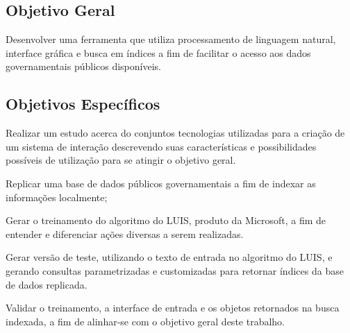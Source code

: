 \subsection{Objetivo Geral}
Desenvolver uma ferramenta que utiliza processamento de linguagem natural, interface gráfica e busca em índices a fim de facilitar o acesso aos dados governamentais públicos disponíveis.

\subsection{Objetivos Específicos}
Realizar um estudo acerca do conjuntos tecnologias utilizadas para a criação de um sistema de interação descrevendo suas características e possibilidades possíveis de utilização para se atingir o objetivo geral.

Replicar uma base de dados públicos governamentais a fim de indexar as informações localmente;

Gerar o treinamento do algoritmo do LUIS, produto da Microsoft, a fim de entender e diferenciar ações diversas a serem realizadas.

Gerar versão de teste, utilizando o texto de entrada no algoritmo do LUIS, e gerando consultas parametrizadas e customizadas para retornar índices da base de dados replicada.

Validar o treinamento, a interface de entrada e os objetos retornados na busca indexada, a fim de alinhar-se com o objetivo geral deste trabalho.
